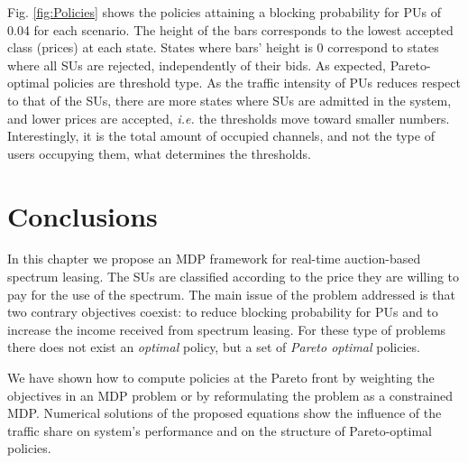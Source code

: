 Fig. \ref{fig:Policies} shows the policies attaining a blocking probability for PUs of 0.04 for each scenario.
The height of the bars corresponds to the lowest accepted class (prices) at each state. States where bars' height is $0$ correspond to states where all SUs are rejected, independently of their bids. As expected, Pareto-optimal policies are threshold type. As the traffic intensity of PUs reduces respect to that of the SUs, there are more states where SUs are admitted in the system, and lower prices are accepted, \textit{i.e.} the thresholds move toward smaller numbers. Interestingly, it is the total amount of occupied channels, and not the type of users occupying them, what determines the thresholds.


\section{Conclusions}\label{Sarnoff_sec_conclusions}
In this chapter we propose an MDP framework for real-time auction-based spectrum leasing. The SUs are classified according to the price they are willing to pay for the use of the spectrum. The main issue of the problem addressed is that two contrary objectives coexist: to reduce blocking probability for PUs and to increase the income received from spectrum leasing. For these type of problems there does not exist an \textit{optimal} policy, but a set of \textit{Pareto optimal} policies. 

We have shown how to compute policies at the Pareto front by weighting the objectives in an MDP problem or by reformulating the problem as a constrained MDP. 
Numerical solutions of the proposed equations show the influence of the traffic share on system's performance and on the structure of Pareto-optimal policies. 




